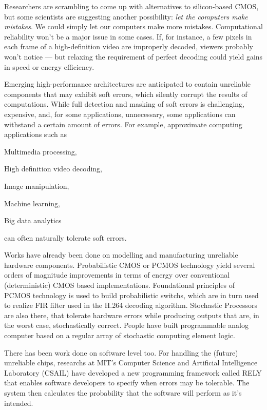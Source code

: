 \documentclass[final,3p, review, times]{Elsevier/elsarticle}
\begin{document}
Researchers are scrambling to come up with alternatives to silicon-based CMOS, but some scientists are suggesting another possibility: \emph{let the computers make mistakes}. We could simply let our computers make more mistakes. Computational reliability won't be a major issue in some cases. If, for instance, a few pixels in each frame of a high-definition video are improperly decoded, viewers probably won’t notice --- but relaxing the requirement of perfect decoding could yield gains in speed or energy efficiency.

Emerging high-performance architectures are anticipated to contain unreliable components that may exhibit soft errors, which silently corrupt the results of computations. While full detection and masking of soft errors is challenging, expensive, and, for some applications, unnecessary, some applications can withstand a certain amount of errors. For example, approximate computing applications such as
\begin{inparaenum}
  \item Multimedia processing,
  \item High definition video decoding,
  \item Image manipulation,
  \item Machine learning,
  \item Big data analytics
\end{inparaenum}
can often naturally tolerate soft errors.

Works have already been done on modelling and manufacturing unreliable hardware components. Probabilistic CMOS or PCMOS technology yield several orders of magnitude improvements in terms of energy over conventional (deterministic) CMOS based implementations\cite{chakrapani08}. Foundational principles of PCMOS technology is used to build probabilistic switchs, which are in turn used to realize FIR filter used in the H.264 decoding algorithm\cite{marpe05}. Stochastic Processors are also there, that tolerate hardware errors while producing outputs that are, in the worst case, stochastically correct. People have built programmable analog computer based on a regular array of stochastic computing element logic\cite{rascel69}.

There has been work done on software level too. For handling the (future) unreliable chips, researchs at MIT's Computer Science and Artificial Intelligence Laboratory (CSAIL) have developed a new programming framework called RELY\cite{carbin13} that enables software developers to specify when errors may be tolerable. The system then calculates the probability that the software will perform as it's intended.
\end{document}
